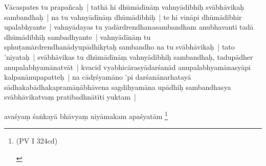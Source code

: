 \documentclass[article,12pt,a4paper]{memoir}
\begin{document}
	  \pstart Vācaspates tu prapañcaḥ | tathā hi dhūmādīnāṃ vahnyādibhiḥ svābhāvikaḥ sambandhaḥ | na tu vahnyādīnāṃ dhūmādibhiḥ | te hi vināpi dhūmādibhir upalabhyante | vahnyādayas tu yadārdrendhanasambandham anubhavanti tadā dhūmādibhiḥ sambadhyante | vahnyādīnāṃ tu sphuṭamārdrendhanādyupādhikṛtaḥ sambandho na tu svābhāvikaḥ | tato 'niyataḥ | svābhāvikas tu dhūmādīnāṃ vahnyādibhiḥ sambandhaḥ, tadupādher anupalabhyamānatvāt | kvacid vyabhicārasyādarśanād anupalabhyamānasyāpi kalpanānupapatteḥ | na cādṛśyamāno 'pi darśanānarhatayā sādhakabādhakapramāṇābhāvena sagdihyamāna upādhiḥ sambandhasya svābhāvikatvaṃ pratibadhnātīti yuktam |
	\pend
      

	  \pstart avaśyaṃ śaṅkayā bhāvyaṃ niyāmakam apaśyatām \footnote{\begin{english}(PV I 324cd)\end{english}}
	\pend
      
\end{document}
